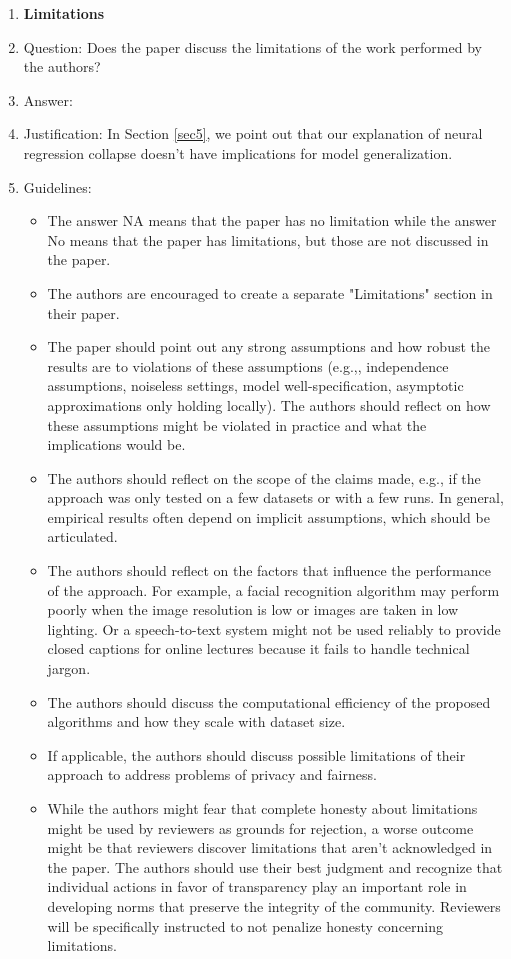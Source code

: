 \documentclass{article}
\theoremstyle{plain}
\theoremstyle{definition}
\theoremstyle{remark}
\begin{document}
\begin{enumerate}
\item {\bf Limitations}
    \item[] Question: Does the paper discuss the limitations of the work performed by the authors?
    \item[] Answer: \answerYes{} %
    \item[] Justification: In Section \ref{sec5}, we point out that our explanation of neural regression collapse doesn't have implications for model generalization.
    \item[] Guidelines:
    \begin{itemize}
        \item The answer NA means that the paper has no limitation while the answer No means that the paper has limitations, but those are not discussed in the paper. 
        \item The authors are encouraged to create a separate "Limitations" section in their paper.
        \item The paper should point out any strong assumptions and how robust the results are to violations of these assumptions (e.g.,, independence assumptions, noiseless settings, model well-specification, asymptotic approximations only holding locally). The authors should reflect on how these assumptions might be violated in practice and what the implications would be.
        \item The authors should reflect on the scope of the claims made, e.g., if the approach was only tested on a few datasets or with a few runs. In general, empirical results often depend on implicit assumptions, which should be articulated.
        \item The authors should reflect on the factors that influence the performance of the approach. For example, a facial recognition algorithm may perform poorly when the image resolution is low or images are taken in low lighting. Or a speech-to-text system might not be used reliably to provide closed captions for online lectures because it fails to handle technical jargon.
        \item The authors should discuss the computational efficiency of the proposed algorithms and how they scale with dataset size.
        \item If applicable, the authors should discuss possible limitations of their approach to address problems of privacy and fairness.
        \item While the authors might fear that complete honesty about limitations might be used by reviewers as grounds for rejection, a worse outcome might be that reviewers discover limitations that aren't acknowledged in the paper. The authors should use their best judgment and recognize that individual actions in favor of transparency play an important role in developing norms that preserve the integrity of the community. Reviewers will be specifically instructed to not penalize honesty concerning limitations.
    \end{itemize}


\end{enumerate}
\end{document}

